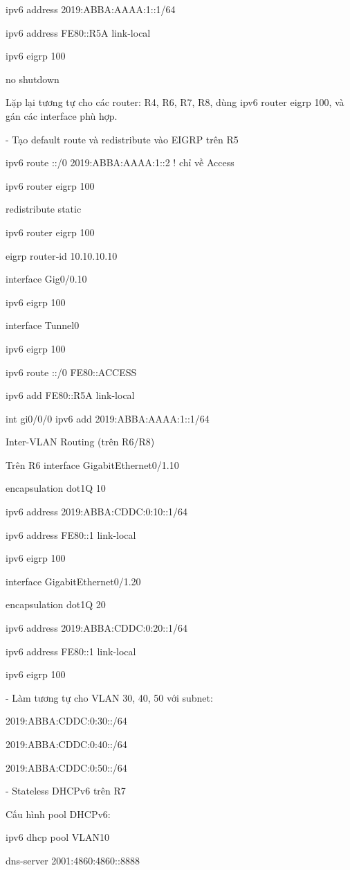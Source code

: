 \documentclass[13pt]{article}
\begin{document}
 ipv6 address 2019:ABBA:AAAA:1::1/64
 
 ipv6 address FE80::R5A link-local
 
 ipv6 eigrp 100
 
 no shutdown
 
Lặp lại tương tự cho các router: R4, R6, R7, R8, dùng ipv6 router eigrp 100, và gán các interface phù hợp.

- Tạo default route và redistribute vào EIGRP trên R5

ipv6 route ::/0 2019:ABBA:AAAA:1::2  ! chỉ về Access

ipv6 router eigrp 100

 redistribute static

ipv6 router eigrp 100

 eigrp router‑id 10.10.10.10
 
interface Gig0/0.10

 ipv6 eigrp 100

interface Tunnel0

 ipv6 eigrp 100

ipv6 route ::/0 FE80::ACCESS   

ipv6 add FE80::R5A link-local


int gi0/0/0
ipv6 add 2019:ABBA:AAAA:1::1/64

Inter-VLAN Routing (trên R6/R8)

Trên R6 
interface GigabitEthernet0/1.10

 encapsulation dot1Q 10
 
 ipv6 address 2019:ABBA:CDDC:0:10::1/64
 
 ipv6 address FE80::1 link-local
 
 ipv6 eigrp 100

interface GigabitEthernet0/1.20

 encapsulation dot1Q 20
 
 ipv6 address 2019:ABBA:CDDC:0:20::1/64
 
 ipv6 address FE80::1 link-local
 
 ipv6 eigrp 100
 
- Làm tương tự cho VLAN 30, 40, 50 với subnet:

2019:ABBA:CDDC:0:30::/64

2019:ABBA:CDDC:0:40::/64

2019:ABBA:CDDC:0:50::/64

- Stateless DHCPv6 trên R7

Cấu hình pool DHCPv6:

ipv6 dhcp pool VLAN10

 dns-server 2001:4860:4860::8888
 
\end{document}
